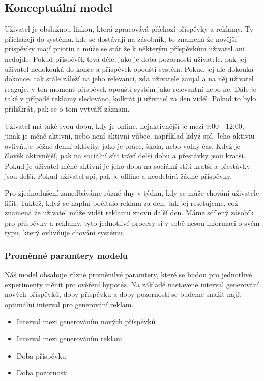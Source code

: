 \documentclass[11pt, a4paper]{article}
\begin{document}
\subsection{Konceptuální model}
Uživatel je obslužnou linkou, která zpracovává příchozí příspěvky a reklamy. Ty přicházejí do systému, kde se dostávají na zásobník,
to znamená že novější příspěvky mají priotiu a může se stát že k některým příspěvkům uživatel ani nedojde.
Pokud příspěvěk trvá déle, jako je doba pozornosti uživatele, pak jej uživatel nedokouká do konce a příspěvek opouští systém.
Pokud jej ale dokouká dokonce, tak stále záleží na jeho relevanci, zda uživatele zaujal a na něj uživatel reaguje, v ten moment příspěvek opouští systém jako relevantní nebo ne.
Dále je také v případě reklamy sledováno, kolkrát ji uživatel za den viděl.
Pokud to bylo příliškrát, pak se o tom vytváří záznam.

Uživatel má také svou dobu, kdy je online, nejaktivnější je mezi 9:00 - 12:00, jinak je méně aktivní, nebo není aktivní vůbec, například když spí.
Jeho aktiviu ovlivňuje běžné denní aktivity, jako je práce, škola, nebo volný čas. Když je člověk aktivnější, pak na sociální síti tráví delší dobu a přestávky jsou kratší.
Pokud je uživatel méně aktivní je jeho doba na sociální stíti kratší a přestávky jsou delší. Pokud uživatel spí, pak je offline a neodebírá žádně příspěvky.

Pro zjednodušení zanedbáváme různé dny v týdnu, kdy se může chování uživatele lišit. Taktéž, když se naplní počítalo reklam za den, tak jej resetujeme,
což znamená že uživatel může vidět reklamu znovu další den.
Máme sdílený zásobík pro příspěvky a reklamy, tyto jednotlivé procesy si v sobě nesou informaci o svém typu, který ovlivňuje chování systému.

\subsubsection{Proměnné paramtery modelu}
Náš model obsahuje různé proměnilvé paramtery, které se budou pro jednotlivé experimenty měnit pro ověření hypotéz.
Na základě nastavené interval generování nových příspěvků, doby příspěvku a doby pozornosti se budeme snažit najít optimální interval pro generování reklam.
\begin{itemize}
    \item Interval mezi generováním nových příspěvků
    \item Interval mezi generováním reklam
    \item Doba příspěvku
    \item Doba pozornosti
\end{itemize}
\end{document}
